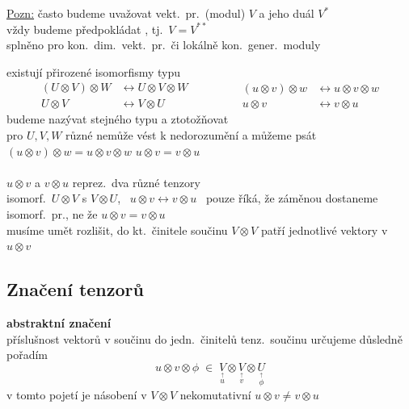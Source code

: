 \underline{Pozn:} často budeme uvažovat vekt.\ pr.\ (modul) $V$ a jeho duál $V^*$ \\
\quad vždy budeme předpokládat , tj.\ $V = V^{**}$ \\
\quad splněno pro kon.\ dim.\ vekt.\ pr.\ či lokálně kon.\ gener.\ moduly

existují přirozené isomorfismy typu
\[
  \begin{aligned}
    (U\otimes V)\otimes W &\leftrightarrow U\otimes V\otimes W \\
    U\otimes V &\leftrightarrow V\otimes U
  \end{aligned}
  \qquad\qquad
  \begin{aligned}
    (u\otimes v)\otimes w &\leftrightarrow u\otimes v\otimes w \\
    u\otimes v &\leftrightarrow v\otimes u
  \end{aligned}
\]
budeme nazývat stejného typu a ztotožňovat \\
pro $U, V, W$ různé nemůže vést k nedorozumění a můžeme psát \\
\quad $(u\otimes v)\otimes w = u\otimes v\otimes w$ \qquad $u\otimes v = v\otimes u$ \\
 \\
\quad $u\otimes v$ a $v\otimes u$ reprez.\ dva různé tenzory \\
\quad isomorf.\ $U\otimes V$ s $V\otimes U$, \ $u\otimes v\leftrightarrow v\otimes u$ \ pouze říká, že záměnou dostaneme isomorf.\ pr., ne že $u\otimes v = v\otimes u$ \\
\quad musíme umět rozlišit, do kt.\ činitele součinu $V\otimes V$ patří jednotlivé vektory v $u\otimes v$

\subsection{Značení tenzorů}
\providecommand{\gmIpa}{\underline{a}}
\providecommand{\gmIpb}{\underline{b}}
\providecommand{\gmIpc}{\underline{c}}
\providecommand{\gmIpA}{\underline{\mathsf{A}}}
\providecommand{\gmIpB}{\underline{\mathsf{B}}}

\textbf{abstraktní značení} \\
\quad příslušnost vektorů v součinu do jedn.\ činitelů tenz.\ součinu určujeme důsledně pořadím
\[
  u\otimes v\otimes\phi \;\in\; \underset{\textstyle\overset{\uparrow}{u}}{V}\otimes\underset{\textstyle\overset{\uparrow}{v}}{V}\otimes\underset{\textstyle\overset{\uparrow}{\phi}}{U}
\]
\quad v tomto pojetí je násobení v $V\otimes V$ nekomutativní \quad $u\otimes v\neq v\otimes u$

